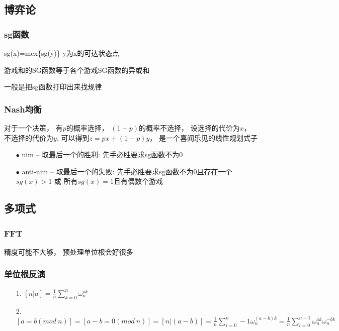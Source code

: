 \documentclass[UTF8]{article}
\newcommand{\cppcode}[1]{
    
}
\begin{document}
\subsection{博弈论}
\subsubsection{sg函数}

sg(x)=mex\{sg(y)\} y为x的可达状态点

游戏和的SG函数等于各个游戏SG函数的异或和

一般是把sg函数打印出来找规律

\subsubsection{Nash均衡}

对于一个决策， 有$p$的概率选择， $(1-p)$的概率不选择， 设选择的代价为$x$， 不选择的代价为$y$,  可以得到$z = px + (1-p)y$， 是一个喜闻乐见的线性规划式子

\begin{enumerate}
	\item[$\bullet$]nim -- 取最后一个的胜利: 先手必胜要求sg函数不为0
	\item[$\bullet$]anti-nim -- 取最后一个的失败: 先手必胜要求sg函数不为0且存在一个$sg(x)>1$ 或 所有$sg(x)=1$且有偶数个游戏
\end{enumerate}

\subsection{多项式}

\subsubsection{FFT}
精度可能不大够， 预处理单位根会好很多
\cppcode{FFT.cpp}

\subsubsection{单位根反演}
	\begin{enumerate}	
		\item[1.]$[n|a] = \frac{1}{n} \sum_{k=0}^n \omega_n^{ak} $
		\item[2.]$[a = b(mod\ n)] = [a - b = 0(mod\ n)] = [n|(a-b)] = \frac{1}{n}\sum_{i=0}^n-1 \omega_n^{(a-b)k} = \frac{1}{n}\sum_{i=0}^{n-1}\omega_n^{ak}\omega_{n}^{-bk}$
	\end{enumerate}
\end{document}
